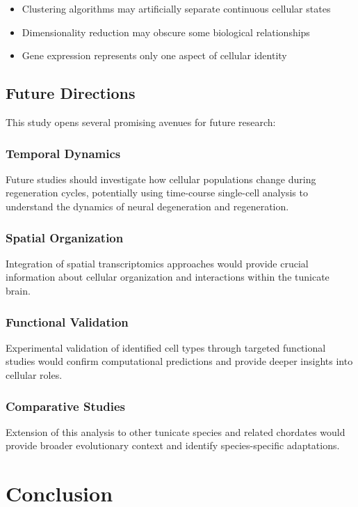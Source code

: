 \documentclass[12pt,a4paper]{article}
\begin{document}
\begin{itemize}
\item Clustering algorithms may artificially separate continuous cellular states
\item Dimensionality reduction may obscure some biological relationships
\item Gene expression represents only one aspect of cellular identity
\end{itemize}

\subsection{Future Directions}

This study opens several promising avenues for future research:

\subsubsection{Temporal Dynamics}
Future studies should investigate how cellular populations change during regeneration cycles, potentially using time-course single-cell analysis to understand the dynamics of neural degeneration and regeneration.

\subsubsection{Spatial Organization}
Integration of spatial transcriptomics approaches would provide crucial information about cellular organization and interactions within the tunicate brain.

\subsubsection{Functional Validation}
Experimental validation of identified cell types through targeted functional studies would confirm computational predictions and provide deeper insights into cellular roles.

\subsubsection{Comparative Studies}
Extension of this analysis to other tunicate species and related chordates would provide broader evolutionary context and identify species-specific adaptations.

\section{Conclusion}
\end{document}
